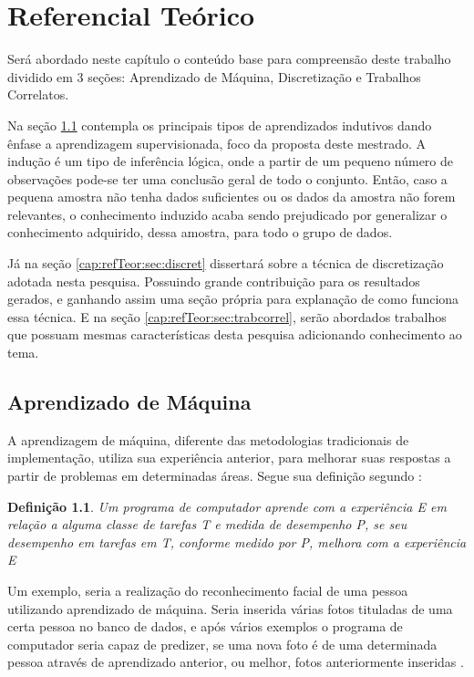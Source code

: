 \chapter{Referencial Teórico}\label{cap:refTeor}



Será abordado neste capítulo o conteúdo base para compreensão deste trabalho dividido em 3 seções: Aprendizado de Máquina, Discretização e Trabalhos Correlatos. 

Na seção \ref{cap:refTeor:sec:aprendMaq} contempla os principais tipos de aprendizados indutivos  dando ênfase a aprendizagem supervisionada, foco da proposta deste mestrado. A indução é um tipo de inferência lógica, onde a partir de um pequeno número de observações pode-se ter uma conclusão geral de todo o conjunto. Então, caso a pequena amostra não tenha dados suficientes ou os dados da amostra não forem relevantes, o conhecimento induzido acaba sendo prejudicado por generalizar o conhecimento adquirido, dessa amostra, para todo o grupo de dados.

Já na seção \ref{cap:refTeor:sec:discret} dissertará sobre a técnica de discretização adotada nesta pesquisa. Possuindo grande contribuição para os resultados gerados, e ganhando assim uma seção própria para explanação de como funciona essa técnica. E na seção \ref{cap:refTeor:sec:trabcorrel}, serão abordados trabalhos que possuam mesmas características desta pesquisa adicionando conhecimento ao tema.



\section{Aprendizado de Máquina}\label{cap:refTeor:sec:aprendMaq}

 A aprendizagem de máquina, diferente das metodologias tradicionais de implementação, utiliza sua experiência anterior, para melhorar suas respostas a partir de problemas em determinadas áreas. Segue sua definição segundo :
 
 \newtheorem{defaprendmaq}{Definição}
  \begin{defaprendmaq}
   Um programa de computador aprende com a experiência E em relação a alguma classe de tarefas T e medida de desempenho P, se seu desempenho em tarefas em T, conforme medido por P, melhora com a experiência E
   \label{teo:defaprendmaq}
  \end{defaprendmaq}
 
 Um exemplo, seria a realização do reconhecimento facial de uma pessoa utilizando aprendizado de máquina. Seria inserida várias fotos tituladas de uma certa pessoa no banco de dados, e após vários exemplos o programa de computador seria capaz de predizer, se uma nova foto é de uma determinada pessoa através de aprendizado  anterior, ou melhor, fotos anteriormente inseridas .


